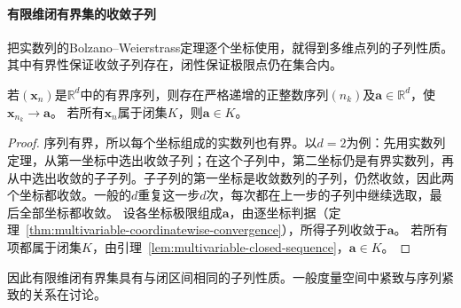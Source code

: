 \paragraph{有限维闭有界集的收敛子列}
把实数列的Bolzano--Weierstrass定理逐个坐标使用，就得到多维点列的子列性质。其中有界性保证收敛子列存在，闭性保证极限点仍在集合内。
\begin{theorem}[有限维有界序列的收敛子列]
\label{thm:multivariable-bolzano-weierstrass}
若$(\bm x_n)$是$\mathbb R^d$中的有界序列，则存在严格递增的正整数序列$(n_k)$及$\bm a\in\mathbb R^d$，使$\bm x_{n_k}\to\bm a$。
若所有$\bm x_n$属于闭集$K$，则$\bm a\in K$。
\end{theorem}
\begin{proof}
序列有界，所以每个坐标组成的实数列也有界。以$d=2$为例：先用实数列定理，从第一坐标中选出收敛子列；在这个子列中，第二坐标仍是有界实数列，再从中选出收敛的子子列。子子列的第一坐标是收敛数列的子列，仍然收敛，因此两个坐标都收敛。一般的$d$重复这一步$d$次，每次都在上一步的子列中继续选取，最后全部坐标都收敛。
设各坐标极限组成$\bm a$，由逐坐标判据（定理~\ref{thm:multivariable-coordinatewise-convergence}），所得子列收敛于$\bm a$。
若所有项都属于闭集$K$，由引理~\ref{lem:multivariable-closed-sequence}，$\bm a\in K$。
\end{proof}
因此有限维闭有界集具有与闭区间相同的子列性质。一般度量空间中紧致与序列紧致的关系在讨论。

